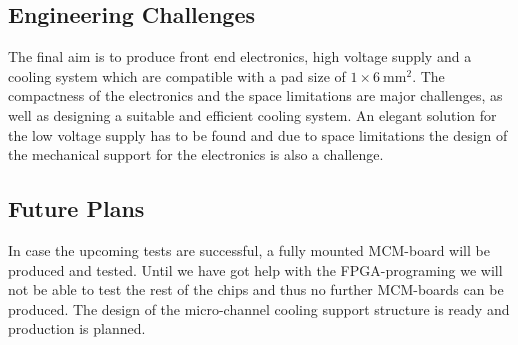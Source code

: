 \subsection{Engineering Challenges}
The final aim is to produce front end electronics, high voltage supply and a cooling system which are compatible with a pad size of $1 \times \SI{6}{\milli\meter\squared}$. The compactness of the electronics and the space limitations are major challenges, as well as designing a suitable and efficient cooling system. An elegant solution for the low voltage supply has to be found and due to space limitations the design of the mechanical support for the electronics is also a challenge.

\subsection{Future Plans}
In case the upcoming tests are successful, a fully mounted MCM-board will be produced and tested.
Until we have got help with the FPGA-programing we will not be able to test the rest of the chips and
thus no further MCM-boards can be produced.
The design of the micro-channel cooling support structure is ready and production is planned.
